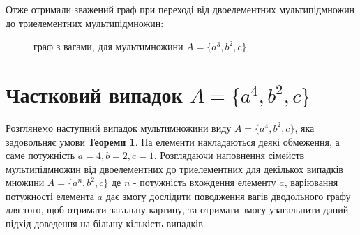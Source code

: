 Отже отримали зважений граф при переході від двоелементних мультипідмножин до триелементних мультипідмножин:
\begin{figure}
\begin{center}
\end{center}
\caption{граф з вагами, для мультимножини  $A = \{a^3, b^2, c\}$}
\end{figure}


\section{Частковий випадок $A = \{a^4, b^2, c\}$}

Розглянемо наступний випадок мультимножини виду $A = \{a^4, b^2, c\}$, яка задовольняє умови {\bf Теореми 1}. На елементи накладаються деякі обмеження, а саме потужність $a = 4, b = 2, c = 1$. Розглядаючи наповнення сімейств мультипідмножин від двоелементних до триелементних для декількох випадків множини $A = \{a^n, b^2, c\}$  де $n$ - потужність вхождення елементу $a$, варіювання потужності елемента $a$ дає змогу дослідити поводження вагів дводольного графу для того, щоб отримати загальну картину, та отримати змогу узагальнити даний підхід доведення на більшу кількість випадків.


